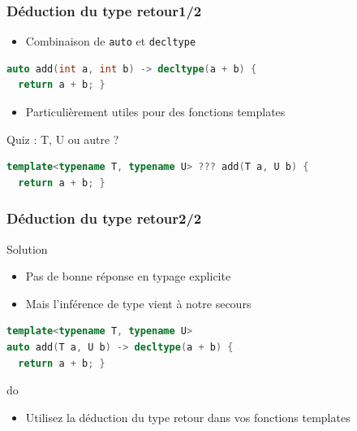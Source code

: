 \documentclass[C++.tex]{subfiles}
\begin{document}
\begin{frame}[fragile]
	\frametitle{Déduction du type retour\titlehfill{}1/2}
	\begin{itemize}
		\item Combinaison de \lstinline|auto| et \lstinline|decltype|
	\end{itemize}

	\begin{lstlisting}[language=C++]
auto add(int a, int b) -> decltype(a + b) {
  return a + b; }\end{lstlisting}

	\begin{itemize}
		\item Particulièrement utiles pour des fonctions templates
	\end{itemize}

	\begin{block}{Quiz : T, U ou autre ?}
		\begin{lstlisting}[language=C++]
template<typename T, typename U> ??? add(T a, U b) {
  return a + b; }\end{lstlisting}

	\end{block}
\end{frame}

\begin{frame}[fragile]
	\frametitle{Déduction du type retour\titlehfill{}2/2}
	\begin{block}{Solution}
		\begin{itemize}
			\item Pas de bonne réponse en typage explicite
			\item Mais l'inférence de type vient à notre secours
		\end{itemize}
	\end{block}

	\begin{lstlisting}[language=C++]
template<typename T, typename U>
auto add(T a, U b) -> decltype(a + b) {
  return a + b; }\end{lstlisting}

	\begin{exampleblock}{do}
		\begin{itemize}
			\item Utilisez la déduction du type retour dans vos fonctions templates
		\end{itemize}
	\end{exampleblock}
\end{frame}
\end{document}
